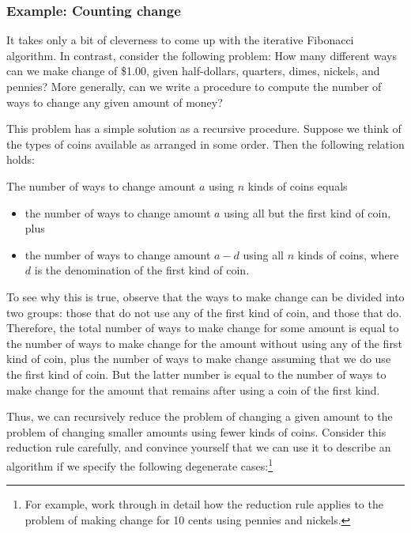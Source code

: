 \subsubsection*{Example: Counting change}

It takes only a bit of cleverness to come up with the iterative Fibonacci
algorithm.  In contrast, consider the following problem: How many different
ways can we make change of \$1.00, given half-dollars, quarters, dimes,
nickels, and pennies?  More generally, can we write a procedure to compute the
number of ways to change any given amount of money?

This problem has a simple solution as a recursive procedure.  Suppose we think
of the types of coins available as arranged in some order.  Then the following
relation holds:

\begin{niceQuote}
The number of ways to change amount \( a \) using \( n \) kinds of coins equals
\begin{itemize}
\item
the number of ways to change amount \( a \) using all but the first kind of coin,
plus
\item
the number of ways to change amount \( a - d \) using all \( n \) kinds of
coins, where \( d \) is the denomination of the first kind of coin.
\end{itemize}
\end{niceQuote}

\noindent
To see why this is true, observe that the ways to make change can be divided
into two groups: those that do not use any of the first kind of coin, and those
that do.  Therefore, the total number of ways to make change for some amount is
equal to the number of ways to make change for the amount without using any of
the first kind of coin, plus the number of ways to make change assuming that we
do use the first kind of coin.  But the latter number is equal to the number of
ways to make change for the amount that remains after using a coin of the first
kind.

Thus, we can recursively reduce the problem of changing a given amount to the
problem of changing smaller amounts using fewer kinds of coins.  Consider this
reduction rule carefully, and convince yourself that we can use it to describe
an algorithm if we specify the following degenerate cases:\footnote{For
example, work through in detail how the reduction rule applies to the problem
of making change for 10 cents using pennies and nickels.}

